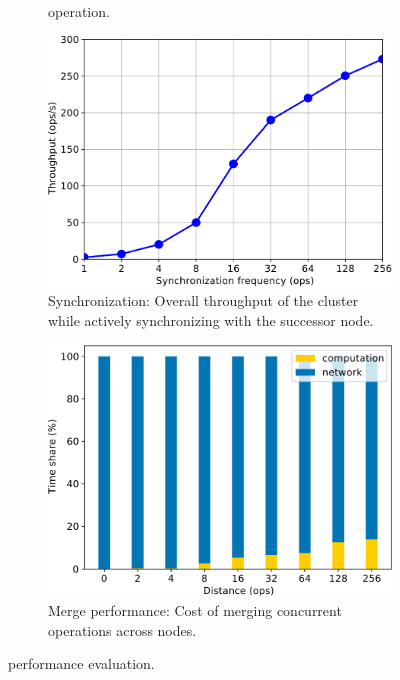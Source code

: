 \begin{figure}[t]
\begin{subfigure}{0.45\textwidth}
{			operation.}
		\label{grf:scalability}
	\end{subfigure}
	\par\bigskip
	\begin{subfigure}{0.45\textwidth}
		\includegraphics[width=\textwidth]{Graphs/synchronization.pdf}
		\caption{Synchronization: Overall throughput of the cluster while actively
			synchronizing with the successor node.}
		\label{grf:synchronization}
	\end{subfigure}
	\hfill
	\begin{subfigure}{0.45\textwidth}
		\includegraphics[width=\textwidth]{Graphs/merge.pdf}
		\caption{Merge performance: Cost of merging concurrent operations across
		nodes.}
		\label{grf:merge}
	\end{subfigure}
	\caption{\name performance evaluation.}
  \label{grf:evaluation}
\end{figure}

